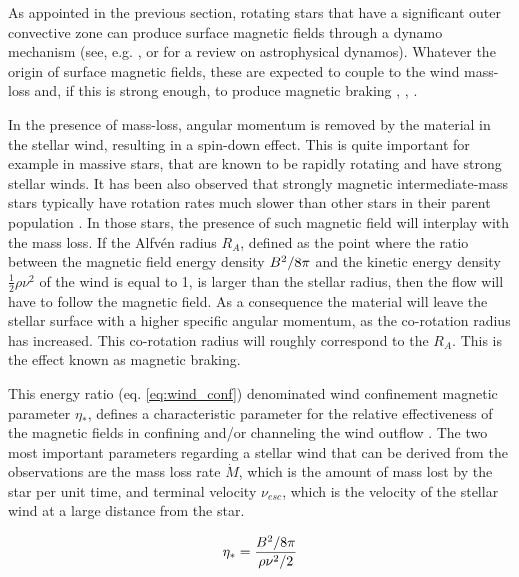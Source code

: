\documentclass[fleqn,usenatbib]{mnras}
\begin{document}
As appointed in the previous section, rotating stars that have a significant outer convective zone can produce surface magnetic fields through a dynamo mechanism (see, e.g. \citet{Brandenburg2004}, \citet{Charbonneau2010} or \citet{Brun2017} for a review on astrophysical dynamos). Whatever the origin of surface magnetic fields, these are expected to couple to the wind mass-loss and, if this is strong enough, to produce magnetic braking \citet{UdDoula2002}, \citet{Ud-Doula2007}, \citet{Ud-Doula2008} \citet{Meynet2010}.\par

In the presence of mass-loss, angular momentum is removed by the material in the stellar wind, resulting in a spin-down effect. This is quite important for example in massive stars, that are known to be rapidly rotating and have strong stellar winds. It has been also observed that strongly magnetic intermediate-mass stars typically have rotation rates much slower than other stars in their parent population \citep{Mathys2006}. In those stars, the presence of such magnetic field will interplay with the mass loss. If the Alfv\'{e}n radius $R_{A}$, defined as the point where the ratio between the magnetic field energy density $B^{2}/8\pi$ and the kinetic energy density $\frac{1}{2}\rho\nu^{2}$ of the wind is equal to 1, is larger than the stellar radius, then the flow will have to follow the magnetic field. As a consequence the material will leave the stellar surface with a higher specific angular momentum, as the co-rotation radius has increased. This co-rotation radius will roughly correspond to the $R_{A}$. This is the effect known as magnetic braking.\par

This energy ratio (eq. \ref{eq:wind_conf}) denominated wind confinement magnetic parameter $\eta_*$, defines a characteristic parameter for the relative effectiveness of the magnetic fields in confining and/or channeling the wind outflow \citep{UdDoula2002}. The two most important parameters regarding a stellar wind that can be derived from the observations are the mass loss rate $\Dot{M}$, which is the amount of mass lost by the star per unit time, and terminal velocity $\nu_{esc}$, which is the velocity of the stellar wind at a large distance from the star. \par
 
\begin{ceqn}
\begin{equation}
    \eta_* = \frac{B^{2}/8\pi}{\rho\nu^2/2} \label{eq:wind_conf}
\end{equation}
\end{ceqn}
\end{document}
